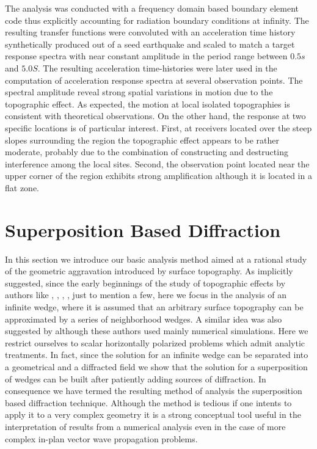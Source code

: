 \documentclass[11pt,letterpaper]{article}
\begin{document}
The analysis was conducted with a frequency domain based boundary element code thus explicitly accounting for radiation boundary conditions at infinity. The resulting transfer functions were convoluted with an acceleration time history synthetically produced out of a seed earthquake and scaled to match a target response spectra with near constant amplitude in the period range between $0.5 s$ and $5.0 S$. The resulting acceleration time-histories were later used in the computation of acceleration response spectra at several observation points. The spectral amplitude reveal strong spatial variations in motion due to the topographic effect. As expected, the motion at local isolated topographies is consistent with theoretical observations. On the other hand, the response at two specific locations is of particular interest. First, at receivers located over the steep slopes surrounding the region the topographic effect appears to be rather moderate, probably due to the combination of constructing and destructing interference among the local sites. Second, the observation point located near the upper corner of the region exhibits strong amplification although it is located in a flat zone.





\newpage

\section{Superposition Based Diffraction}
{}

In this section we introduce our basic analysis method aimed at a rational study of the geometric aggravation introduced by surface topography. As implicitly suggested, since the early beginnings of the study of topographic effects by authors like \cite{ashford1997topographic}, \cite{geli1988effect}, \cite{Trifunac1973}, \cite{sanchez-sesma91}, \cite{sanchez1979ground} just to mention a few, here we focus in the analysis of an infinite wedge, where it is assumed that an arbitrary surface topography can be approximated by a series of neighborhood wedges. A similar idea was also suggested by \cite{mohammadi2017topography} although these authors used mainly numerical simulations. Here we restrict ourselves to scalar horizontally polarized problems which admit analytic treatments. In fact, since the solution for an infinite wedge can be separated into a geometrical and a diffracted field we show that the solution for a superposition of wedges can be built after patiently adding sources of diffraction. In consequence we have termed the resulting method of analysis the superposition based diffraction technique. Although the method is tedious if one intents to apply it to a very complex geometry it is a strong conceptual tool useful in the interpretation of results from a numerical analysis even in the case of more complex in-plan vector wave propagation problems.
\end{document}
